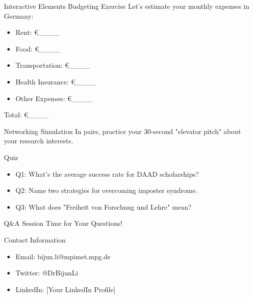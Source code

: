 \documentclass[aspectratio=169,10pt]{beamer}
\begin{document}
\begin{frame}{Interactive Elements}
\alert{Budgeting Exercise}
Let's estimate your monthly expenses in Germany:
\begin{itemize}
    \item Rent: €\_\_\_\_
    \item Food: €\_\_\_\_
    \item Transportation: €\_\_\_\_
    \item Health Insurance: €\_\_\_\_
    \item Other Expenses: €\_\_\_\_
\end{itemize}
Total: €\_\_\_\_

\alert{Networking Simulation}
In pairs, practice your 30-second "elevator pitch" about your research interests.

\alert{Quiz}
\begin{itemize}
    \item Q1: What's the average success rate for DAAD scholarships?
    \item Q2: Name two strategies for overcoming imposter syndrome.
    \item Q3: What does "Freiheit von Forschung und Lehre" mean?
\end{itemize}
\end{frame}

\begin{frame}{Q\&A Session}
\centering
\large{Time for Your Questions!}

\vspace{1cm}


\vspace{1cm}

\alert{Contact Information}
\begin{itemize}
    \item Email: bijun.li@mpimet.mpg.de
    \item Twitter: @DrBijunLi
    \item LinkedIn: [Your LinkedIn Profile]
\end{itemize}
\end{frame}
\end{document}
